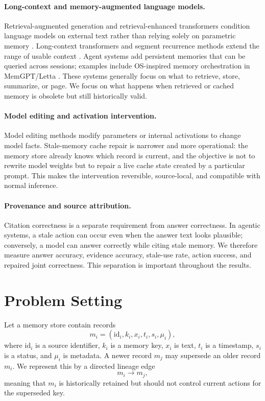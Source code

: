 \documentclass[11pt]{article}
\begin{document}
\paragraph{Long-context and memory-augmented language models.}
Retrieval-augmented generation and retrieval-enhanced transformers condition
language models on external text rather than relying solely on parametric
memory \cite{lewis2020rag,borgeaud2022retro}. Long-context transformers and
segment recurrence methods extend the range of usable context
\cite{dai2019transformerxl}. Agent systems add persistent memories that can be
queried across sessions; examples include OS-inspired memory orchestration in
MemGPT/Letta \cite{packer2023memgpt}. These systems generally focus on what to
retrieve, store, summarize, or page. We focus on what happens when retrieved or
cached memory is obsolete but still historically valid.

\paragraph{Model editing and activation intervention.}
Model editing methods modify parameters or internal activations to change model
facts. Stale-memory cache repair is narrower and more operational: the memory
store already knows which record is current, and the objective is not to
rewrite model weights but to repair a live cache state created by a particular
prompt. This makes the intervention reversible, source-local, and compatible
with normal inference.

\paragraph{Provenance and source attribution.}
Citation correctness is a separate requirement from answer correctness. In
agentic systems, a stale action can occur even when the answer text looks
plausible; conversely, a model can answer correctly while citing stale memory.
We therefore measure answer accuracy, evidence accuracy, stale-use rate,
action success, and repaired joint correctness. This separation is important
throughout the results.

\section{Problem Setting}

Let a memory store contain records
\[
  m_i = (\mathrm{id}_i, k_i, x_i, t_i, s_i, \mu_i),
\]
where $\mathrm{id}_i$ is a source identifier, $k_i$ is a memory key, $x_i$ is
text, $t_i$ is a timestamp, $s_i$ is a status, and $\mu_i$ is metadata. A newer
record $m_j$ may supersede an older record $m_i$. We represent this by a
directed lineage edge
\[
  m_i \rightarrow m_j,
\]
meaning that $m_i$ is historically retained but should not control current
actions for the superseded key.
\end{document}
